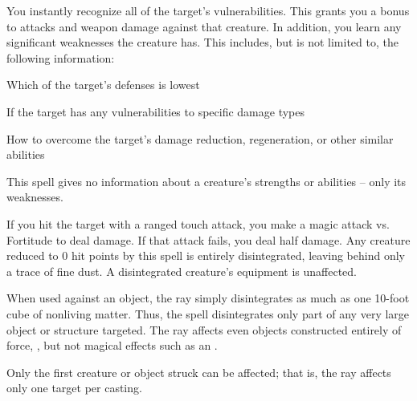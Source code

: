 \begin{spelleffect}
    You instantly recognize all of the target's vulnerabilities. This grants you a  bonus to attacks and weapon damage against that creature. In addition, you learn any significant weaknesses the creature has. This includes, but is not limited to, the following information:
    \begin{itemize*}
        \item Which of the target's defenses is lowest
        \item If the target has any vulnerabilities to specific damage types
        \item How to overcome the target's damage reduction, regeneration, or other similar abilities
    \end{itemize*}
\end{spelleffect}
\begin{spellnotes}
    This spell gives no information about a creature's strengths or abilities -- only its weaknesses.
\end{spellnotes}

\begin{spelleffect}
    If you hit the target with a ranged touch attack, you make a magic attack vs. Fortitude to deal damage. If that attack fails, you deal half damage. Any creature reduced to 0 hit points by this spell is entirely disintegrated, leaving behind only a trace of fine dust. A disintegrated creature's equipment is unaffected.
    \par When used against an object, the ray simply disintegrates as much as one 10-foot cube of nonliving matter. Thus, the spell disintegrates only part of any very large object or structure targeted. The ray affects even objects constructed entirely of force, , but not magical effects such as an .
\end{spelleffect}
\begin{spellnotes}
    Only the first creature or object struck can be affected; that is, the ray affects only one target per casting.
\end{spellnotes}

